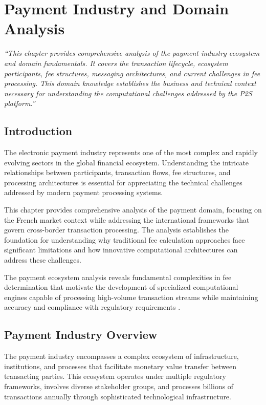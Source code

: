 \chapter{Payment Industry and Domain Analysis}\label{chap:payment-industry}

\textit{``This chapter provides comprehensive analysis of the payment industry ecosystem and domain fundamentals. It covers the transaction lifecycle, ecosystem participants, fee structures, messaging architectures, and current challenges in fee processing. This domain knowledge establishes the business and technical context necessary for understanding the computational challenges addressed by the P2S platform.''}

\pagebreak

\section{Introduction}

The electronic payment industry represents one of the most complex and rapidly evolving sectors in the global financial ecosystem. Understanding the intricate relationships between participants, transaction flows, fee structures, and processing architectures is essential for appreciating the technical challenges addressed by modern payment processing systems.

This chapter provides comprehensive analysis of the payment domain, focusing on the French market context while addressing the international frameworks that govern cross-border transaction processing. The analysis establishes the foundation for understanding why traditional fee calculation approaches face significant limitations and how innovative computational architectures can address these challenges.

The payment ecosystem analysis reveals fundamental complexities in fee determination that motivate the development of specialized computational engines capable of processing high-volume transaction streams while maintaining accuracy and compliance with regulatory requirements \cite{bis2018payment}.

\section{Payment Industry Overview}

The payment industry encompasses a complex ecosystem of infrastructure, institutions, and processes that facilitate monetary value transfer between transacting parties. This ecosystem operates under multiple regulatory frameworks, involves diverse stakeholder groups, and processes billions of transactions annually through sophisticated technological infrastructure.

